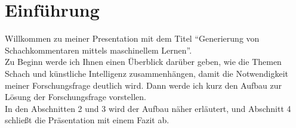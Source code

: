 \section{Einführung}

Willkommen zu meiner Presentation mit dem Titel ``Generierung von Schachkommentaren mittels maschinellem Lernen''.\\

Zu Beginn werde ich Ihnen einen Überblick darüber geben, wie die Themen Schach und künstliche Intelligenz zusammenhängen, damit die Notwendigkeit meiner Forschungsfrage deutlich wird. Dann werde ich kurz den Aufbau zur Lösung der Forschungsfrage vorstellen.\\

In den Abschnitten 2 und 3 wird der Aufbau näher erläutert, und Abschnitt 4 schließt die Präsentation mit einem Fazit ab.